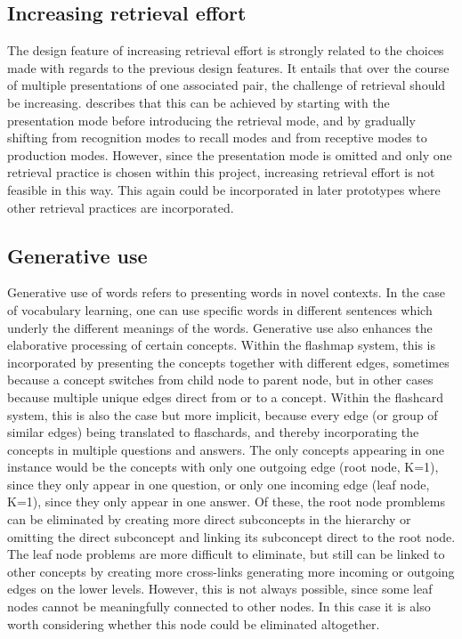         \subsection{Increasing retrieval effort}

The design feature of increasing retrieval effort is strongly related to the choices made with regards to the previous design features. It entails that over the course of multiple presentations of one associated pair, the challenge of retrieval should be increasing.  describes that this can be achieved by starting with the presentation mode before introducing the retrieval mode, and by gradually shifting from recognition modes to recall modes and from receptive modes to production modes. However, since the presentation mode is omitted and only one retrieval practice is chosen within this project, increasing retrieval effort is not feasible in this way. This again could be incorporated in later prototypes where other retrieval practices are incorporated.

        \subsection{Generative use}

Generative use of words refers to presenting words in novel contexts. In the case of vocabulary learning, one can use specific words in different sentences which underly the different meanings of the words. Generative use also enhances the elaborative processing of certain concepts. Within the flashmap system, this is incorporated by presenting the concepts together with different edges, sometimes because a concept switches from child node to parent node, but in other cases because multiple unique edges direct from or to a concept. Within the flashcard system, this is also the case but more implicit, because every edge (or group of similar edges) being translated to flaschards, and thereby incorporating the concepts in multiple questions and answers. The only concepts appearing in one instance would be the concepts with only one outgoing edge (root node, K=1), since they only appear in one question, or only one incoming edge (leaf node, K=1), since they only appear in one answer. Of these, the root node promblems can be eliminated by creating more direct subconcepts in the hierarchy or omitting the direct subconcept and linking its subconcept direct to the root node. The leaf node problems are more difficult to eliminate, but still can be linked to other concepts by creating more cross-links generating more incoming or outgoing edges on the lower levels. However, this is not always possible, since some leaf nodes cannot be meaningfully connected to other nodes. In this case it is also worth considering whether this node could be eliminated altogether.

